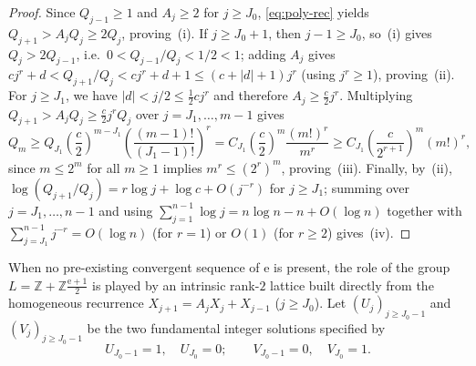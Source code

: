\documentclass[11pt]{article}
\theoremstyle{definition}
\theoremstyle{remark}
\newcommand{\Z}{\mathbb{Z}}
\newcommand{\ee}{\mathrm{e}}
\begin{document}
\begin{proof}
Since $Q_{j-1}\ge1$ and $A_j\ge2$ for $j\ge J_0$, \eqref{eq:poly-rec} yields
$Q_{j+1}>A_jQ_j\ge2Q_j$, proving~(i). If $j\ge J_0+1$, then $j-1\ge J_0$, so~(i)
gives $Q_j>2Q_{j-1}$, i.e.\ $0<Q_{j-1}/Q_j<1/2<1$; adding $A_j$ gives
$cj^r+d<Q_{j+1}/Q_j<cj^r+d+1\le(c+|d|+1)j^r$ (using $j^r\ge1$), proving~(ii). For
$j\ge J_1$, we have $|d|<j/2\le\frac12 cj^r$ and therefore $A_j\ge\frac{c}{2}j^r$.
Multiplying $Q_{j+1}>A_jQ_j\ge\frac{c}{2}j^r Q_j$ over $j=J_1,\dots,m-1$ gives
\[
Q_m\ge Q_{J_1}\left(\frac{c}{2}\right)^{m-J_1}
\left(\frac{(m-1)!}{(J_1-1)!}\right)^r
=C_{J_1}\left(\frac{c}{2}\right)^m\frac{(m!)^r}{m^r}
\ge C_{J_1}\left(\frac{c}{2^{r+1}}\right)^m(m!)^r,
\]
since $m\le2^m$ for all $m\ge1$ implies $m^r\le(2^r)^m$, proving~(iii). Finally,
by~(ii), $\log(Q_{j+1}/Q_j)=r\log j+\log c+O(j^{-r})$ for $j\ge J_1$; summing
over $j=J_1,\dots,n-1$ and using $\sum_{j=1}^{n-1}\log j=n\log n-n+O(\log n)$
together with $\sum_{j=J_1}^{n-1}j^{-r}=O(\log n)$ (for $r=1$) or $O(1)$ (for
$r\ge2$) gives~(iv).
\end{proof}

When no pre-existing convergent sequence of $\ee$ is present, the role of the
group $L=\Z+\Z\frac{\ee+1}{2}$ is played by an intrinsic rank-$2$ lattice built
directly from the homogeneous recurrence $X_{j+1}=A_jX_j+X_{j-1}$ ($j\ge J_0$).
Let $(U_j)_{j\ge J_0-1}$ and $(V_j)_{j\ge J_0-1}$ be the two fundamental integer
solutions specified by
\[
U_{J_0-1}=1,\quad U_{J_0}=0;\qquad V_{J_0-1}=0,\quad V_{J_0}=1.
\]
\end{document}
